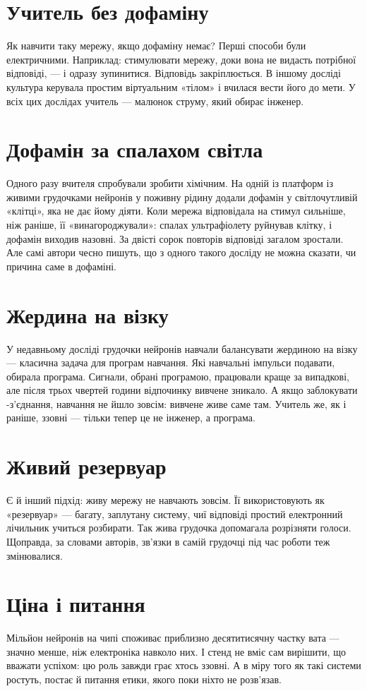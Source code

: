 \section*{Учитель без дофаміну}

Як навчити таку мережу, якщо дофаміну немає? Перші способи були електричними. Наприклад: стимулювати мережу, доки вона не видасть потрібної відповіді, --- і одразу зупинитися. Відповідь закріплюється. В іншому досліді культура керувала простим віртуальним «тілом» і вчилася вести його до мети. У всіх цих дослідах учитель --- малюнок струму, який обирає інженер.

\section*{Дофамін за спалахом світла}

Одного разу вчителя спробували зробити хімічним. На одній із платформ із живими грудочками нейронів у поживну рідину додали дофамін у світлочутливій «клітці», яка не дає йому діяти. Коли мережа відповідала на стимул сильніше, ніж раніше, її «винагороджували»: спалах ультрафіолету руйнував клітку, і дофамін виходив назовні. За двісті сорок повторів відповіді загалом зростали. Але самі автори чесно пишуть, що з одного такого досліду не можна сказати, чи причина саме в дофаміні.

\section*{Жердина на візку}

У недавньому досліді грудочки нейронів навчали балансувати жердиною на візку --- класична задача для програм навчання. Які навчальні імпульси подавати, обирала програма. Сигнали, обрані програмою, працювали краще за випадкові, але після трьох чвертей години відпочинку вивчене зникало. А якщо заблокувати -з'єднання, навчання не йшло зовсім: вивчене живе саме там. Учитель же, як і раніше, ззовні --- тільки тепер це не інженер, а програма.

\section*{Живий резервуар}

Є й інший підхід: живу мережу не навчають зовсім. Її використовують як «резервуар» --- багату, заплутану систему, чиї відповіді простий електронний лічильник учиться розбирати. Так жива грудочка допомагала розрізняти голоси. Щоправда, за словами авторів, зв'язки в самій грудочці під час роботи теж змінювалися.

\section*{Ціна і питання}

Мільйон нейронів на чипі споживає приблизно десятитисячну частку вата --- значно менше, ніж електроніка навколо них. І стенд не вміє сам вирішити, що вважати успіхом: цю роль завжди грає хтось ззовні. А в міру того як такі системи ростуть, постає й питання етики, якого поки ніхто не розв'язав.

